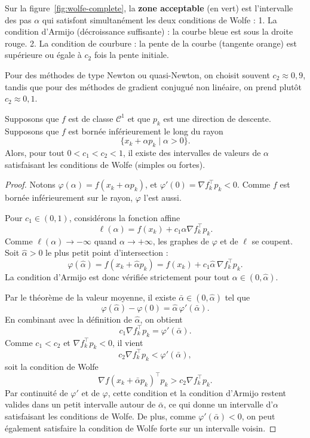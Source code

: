 \begin{figureexplanation}
Sur la figure~\ref{fig:wolfe-complete}, la \textbf{zone acceptable} (en vert) est l'intervalle des pas $\alpha$ qui satisfont simultanément les deux conditions de Wolfe :
1. La condition d'Armijo (décroissance suffisante) : la courbe bleue est sous la droite rouge.
2. La condition de courbure : la pente de la courbe (tangente orange) est supérieure ou égale à $c_2$ fois la pente initiale.
\end{figureexplanation}

\begin{remarque}
Pour des méthodes de type Newton ou quasi-Newton, on choisit souvent
$c_2 \approx 0{,}9$, tandis que pour des méthodes de gradient conjugué
non linéaire, on prend plutôt $c_2 \approx 0{,}1$.
\end{remarque}

\begin{lemme}
\label{lem:Wolfe-existence}
Supposons que $f$ est de classe $\mathcal{C}^1$ et que $p_k$ est une direction de
descente. Supposons que $f$ est bornée inférieurement le long du rayon
\[
    \{ x_k + \alpha p_k \;|\; \alpha > 0 \}.
\]
Alors, pour tout $0 < c_1 < c_2 < 1$, il existe des intervalles de valeurs de
$\alpha$ satisfaisant les conditions de Wolfe (simples ou fortes).
\end{lemme}

\begin{proof}
Notons $\varphi(\alpha) = f(x_k + \alpha p_k)$, et $\varphi'(0) = \nabla f_k^\top p_k < 0$.
Comme $f$ est bornée inférieurement sur le rayon, $\varphi$ l’est aussi.

Pour $c_1 \in (0,1)$, considérons la fonction affine
\[
    \ell(\alpha) = f(x_k) + c_1 \alpha \nabla f_k^\top p_k.
\]
Comme $\ell(\alpha) \to -\infty$ quand $\alpha \to +\infty$, les graphes de
$\varphi$ et de $\ell$ se coupent. Soit $\hat{\alpha}>0$ le plus petit point
d’intersection :
\[
    \varphi(\hat{\alpha})
    = f(x_k + \hat{\alpha} p_k)
    = f(x_k) + c_1 \hat{\alpha}\,\nabla f_k^\top p_k.
\]
La condition d’Armijo est donc vérifiée strictement pour tout $\alpha \in (0,\hat{\alpha})$.

Par le théorème de la valeur moyenne, il existe $\bar{\alpha} \in (0,\hat{\alpha})$ tel que
\[
    \varphi(\hat{\alpha}) - \varphi(0)
    = \hat{\alpha}\,\varphi'(\bar{\alpha}).
\]
En combinant avec la définition de $\hat{\alpha}$, on obtient
\[
    c_1 \nabla f_k^\top p_k
    = \varphi'(\bar{\alpha}).
\]
Comme $c_1 < c_2$ et $\nabla f_k^\top p_k < 0$, il vient
\[
    c_2 \nabla f_k^\top p_k < \varphi'(\bar{\alpha}),
\]
soit la condition de Wolfe
\[
    \nabla f(x_k + \bar{\alpha} p_k)^\top p_k > c_2 \nabla f_k^\top p_k.
\]
Par continuité de $\varphi'$ et de $\varphi$, cette condition et la condition
d’Armijo restent valides dans un petit intervalle autour de $\bar{\alpha}$, ce
qui donne un intervalle d’$\alpha$ satisfaisant les conditions de Wolfe. De plus,
comme $\varphi'(\bar{\alpha})<0$, on peut également satisfaire la condition
de Wolfe forte sur un intervalle voisin.
\end{proof}

